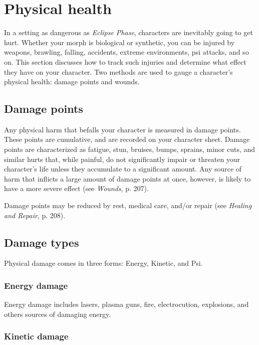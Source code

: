 \section{Physical health}
\label{sec:physical-health}

In a setting as dangerous as \emph{Eclipse Phase}, characters are inevitably going to get hurt. Whether your morph is biological or synthetic, you can be injured by weapons, brawling, falling, accidents, extreme environments, psi attacks, and so on. This section discusses how to track such injuries and determine what effect they have on your character. Two methods are used to gauge a character’s physical health: damage points and wounds.

\subsection{Damage points}
\label{sec:damage-points}

Any physical harm that befalls your character is measured in damage points. These points are cumulative, and are recorded on your character sheet. Damage points are characterized as fatigue, stun, bruises, bumps, sprains, minor cuts, and similar hurts that, while painful, do not significantly impair or threaten your character’s life unless they accumulate to a significant amount. Any source of harm that inflicts a large amount of damage points at once, however, is likely to have a more severe effect (see \emph{Wounds}, p. 207).

Damage points may be reduced by rest, medical care, and/or repair (see \emph{Healing and Repair}, p. 208).


\subsection{Damage types}
\label{sec:damage-types}

Physical damage comes in three forms: Energy, Kinetic, and Psi.

\subsubsection{Energy damage}

Energy damage includes lasers, plasma guns, fire, electrocution, explosions, and others sources of damaging energy.

\subsubsection{Kinetic damage}

